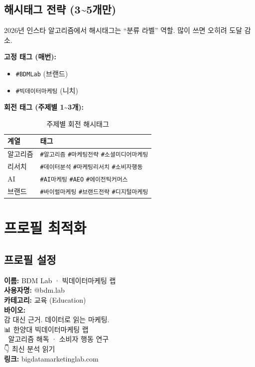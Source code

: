 \documentclass[11pt, a4paper]{article}
\begin{document}
\subsection{해시태그 전략 (3\textasciitilde 5개만)}

2026년 인스타 알고리즘에서 해시태그는 ``분류 라벨'' 역할. 많이 쓰면 오히려 도달 감소.

\vspace{0.5em}

\textbf{고정 태그 (매번):}
\begin{itemize}[leftmargin=2em]
  \item \texttt{\#BDMLab} (브랜드)
  \item \texttt{\#빅데이터마케팅} (니치)
\end{itemize}

\textbf{회전 태그 (주제별 1\textasciitilde 3개):}

\begin{table}[h!]
\centering
\begin{tabular}{l l}
\toprule
\textbf{계열} & \textbf{태그} \\
\midrule
알고리즘 & \texttt{\#알고리즘} \texttt{\#마케팅전략} \texttt{\#소셜미디어마케팅} \\
리서치 & \texttt{\#데이터분석} \texttt{\#마케팅리서치} \texttt{\#소비자행동} \\
AI & \texttt{\#AI마케팅} \texttt{\#AEO} \texttt{\#에이전틱커머스} \\
브랜드 & \texttt{\#바이럴마케팅} \texttt{\#브랜드전략} \texttt{\#디지털마케팅} \\
\bottomrule
\end{tabular}
\caption{주제별 회전 해시태그}
\end{table}


\section{프로필 최적화}

\subsection{프로필 설정}

\begin{tcolorbox}[colback=white, colframe=accent]
\textbf{이름:} BDM Lab · 빅데이터마케팅 랩 \\
\textbf{사용자명:} @bdm.lab \\
\textbf{카테고리:} 교육 (Education) \\[8pt]
\textbf{바이오:} \\
감 대신 근거. 데이터로 읽는 마케팅. \\
📊 한양대 빅데이터마케팅 랩 \\
🔬 알고리즘 해독 · 소비자 행동 연구 \\
👇 최신 분석 읽기 \\[4pt]
\textbf{링크:} bigdatamarketinglab.com
\end{tcolorbox}
\end{document}
